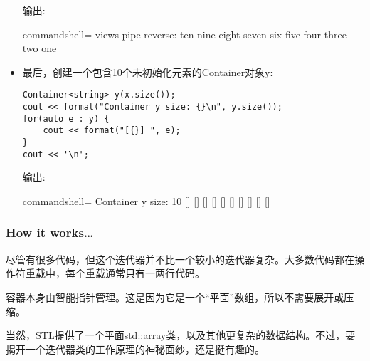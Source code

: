 \begin{itemize}
输出:

\begin{tcblisting}{commandshell={}}
views pipe reverse:
ten nine eight seven six five four three two one
\end{tcblisting}

\item 
最后，创建一个包含10个未初始化元素的Container对象y:

\begin{lstlisting}[style=styleCXX]
Container<string> y(x.size());
cout << format("Container y size: {}\n", y.size());
for(auto e : y) {
	cout << format("[{}] ", e);
}
cout << '\n';
\end{lstlisting}

输出:

\begin{tcblisting}{commandshell={}}
Container y size: 10
[] [] [] [] [] [] [] [] [] []
\end{tcblisting}

\end{itemize}

\subsubsection{How it works…}

尽管有很多代码，但这个迭代器并不比一个较小的迭代器复杂。大多数代码都在操作符重载中，每个重载通常只有一两行代码。

容器本身由智能指针管理。这是因为它是一个“平面”数组，所以不需要展开或压缩。

当然，STL提供了一个平面std::array类，以及其他更复杂的数据结构。不过，要揭开一个迭代器类的工作原理的神秘面纱，还是挺有趣的。

